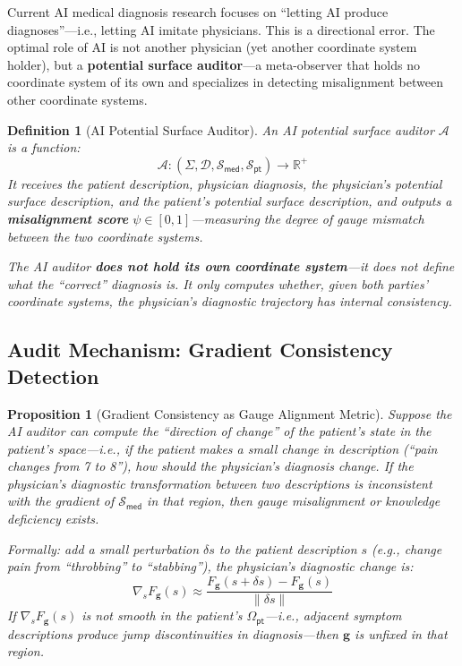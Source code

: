 \documentclass[12pt,a4paper]{article}
\newtheorem{proposition}[theorem]{Proposition}
\newtheorem{definition}[theorem]{Definition}
\theoremstyle{remark}
\newcommand{\R}{\mathbb{R}}
\newcommand{\med}{\textsf{med}}
\newcommand{\pt}{\textsf{pt}}
\begin{document}
Current AI medical diagnosis research focuses on ``letting AI produce diagnoses''---i.e., letting AI imitate physicians. This is a directional error. The optimal role of AI is not another physician (yet another coordinate system holder), but a \textbf{potential surface auditor}---a meta-observer that holds no coordinate system of its own and specializes in detecting misalignment between other coordinate systems.

\begin{definition}[AI Potential Surface Auditor]\label{def:ai_auditor}
An AI potential surface auditor $\mathcal{A}$ is a function:
\begin{equation}
    \mathcal{A}: (\Sigma, \mathcal{D}, \mathcal{S}_{\med}, \mathcal{S}_{\pt}) \to \R^+
\end{equation}
It receives the patient description, physician diagnosis, the physician's potential surface description, and the patient's potential surface description, and outputs a \textbf{misalignment score} $\psi \in [0,1]$---measuring the degree of gauge mismatch between the two coordinate systems.

The AI auditor \textbf{does not hold its own coordinate system}---it does not define what the ``correct'' diagnosis is. It only computes whether, given both parties' coordinate systems, the physician's diagnostic trajectory has internal consistency.
\end{definition}

\subsection{Audit Mechanism: Gradient Consistency Detection}

\begin{proposition}[Gradient Consistency as Gauge Alignment Metric]\label{prop:gradient_consistency}
Suppose the AI auditor can compute the ``direction of change'' of the patient's state in the patient's space---i.e., if the patient makes a small change in description (``pain changes from 7 to 8''), how should the physician's diagnosis change. If the physician's diagnostic transformation between two descriptions is inconsistent with the gradient of $\mathcal{S}_{\med}$ in that region, then gauge misalignment or knowledge deficiency exists.

Formally: add a small perturbation $\delta s$ to the patient description $s$ (e.g., change pain from ``throbbing'' to ``stabbing''), the physician's diagnostic change is:
\begin{equation}
    \nabla_s F_{\mathbf{g}}(s) \approx \frac{F_{\mathbf{g}}(s + \delta s) - F_{\mathbf{g}}(s)}{\|\delta s\|}
\end{equation}
If $\nabla_s F_{\mathbf{g}}(s)$ is not smooth in the patient's $\Omega_{\pt}$---i.e., adjacent symptom descriptions produce jump discontinuities in diagnosis---then $\mathbf{g}$ is unfixed in that region.
\end{proposition}
\end{document}
